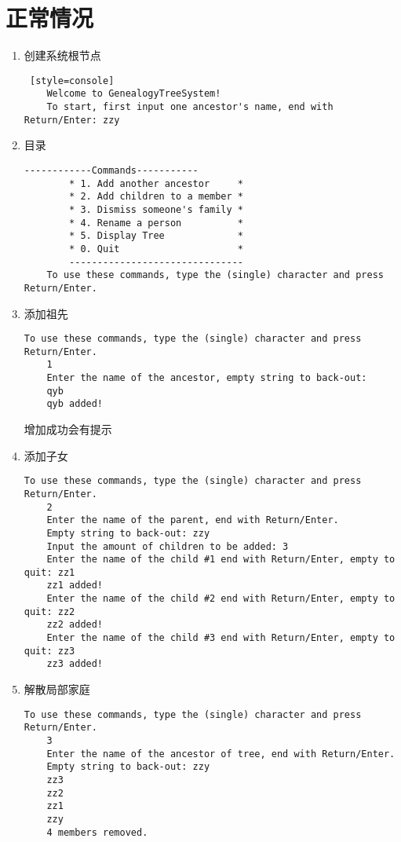 \section{正常情况}
\begin{enumerate}
    \item 创建系统根节点
\begin{lstlisting} [style=console]
    Welcome to GenealogyTreeSystem!
    To start, first input one ancestor's name, end with Return/Enter: zzy
\end{lstlisting}

    \item 目录
\begin{lstlisting}[style=console]
		------------Commands-----------
		* 1. Add another ancestor     *
		* 2. Add children to a member *
		* 3. Dismiss someone's family *
		* 4. Rename a person          *
		* 5. Display Tree             *
		* 0. Quit                     *
		-------------------------------
    To use these commands, type the (single) character and press Return/Enter.
\end{lstlisting}

    \item 添加祖先
\begin{lstlisting}[style=console]
    To use these commands, type the (single) character and press Return/Enter.
    1
    Enter the name of the ancestor, empty string to back-out: 
    qyb
    qyb added!
\end{lstlisting}
    增加成功会有提示

    \item 添加子女
\begin{lstlisting}[style=console]
    To use these commands, type the (single) character and press Return/Enter.
    2
    Enter the name of the parent, end with Return/Enter.
    Empty string to back-out: zzy
    Input the amount of children to be added: 3
    Enter the name of the child #1 end with Return/Enter, empty to quit: zz1
    zz1 added!
    Enter the name of the child #2 end with Return/Enter, empty to quit: zz2
    zz2 added!
    Enter the name of the child #3 end with Return/Enter, empty to quit: zz3
    zz3 added!
\end{lstlisting}

    \item 解散局部家庭
\begin{lstlisting}[style=console]
    To use these commands, type the (single) character and press Return/Enter.
    3
    Enter the name of the ancestor of tree, end with Return/Enter.
    Empty string to back-out: zzy
    zz3
    zz2
    zz1
    zzy
    4 members removed.
\end{lstlisting}


\end{enumerate}
